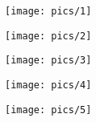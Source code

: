 \begin{figure}[H]
    \centering
    \label{fig:1}
    \texttt{[image: pics/1]}
\end{figure}
\begin{figure}[H]
    \centering
    \label{fig:2}
    \texttt{[image: pics/2]}
\end{figure}
\begin{figure}[H]
    \centering
    \label{fig:3}
    \texttt{[image: pics/3]}
\end{figure}
\begin{figure}[H]
    \centering
    \label{fig:4}
    \texttt{[image: pics/4]}
\end{figure}
\begin{figure}[H]
    \centering
    \label{fig:5}
    \texttt{[image: pics/5]}
\end{figure}

